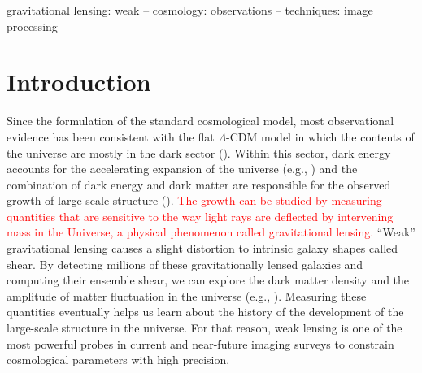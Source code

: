\documentclass[fleqn,usenatbib]{mnras}
\begin{document}
\begin{keywords}
gravitational lensing: weak -- cosmology: observations -- techniques: image processing
\end{keywords}



\section{Introduction}

Since the formulation of the standard cosmological model, most observational evidence has been consistent with the flat $\Lambda$-CDM model in which the contents of the universe are mostly in the dark sector (\citealt{2020A&A...641A...8P, 2020MNRAS.498.2492G, 2020MNRAS.499.5527T, 2021A&A...645A.104A, 2022PhRvD.105b3520A, 2022arXiv220204077B}). Within this sector, dark energy accounts for the accelerating expansion of the universe (e.g., \citealt{1998AJ....116.1009R, 1999AIPC..478..129P}) and the combination of dark energy and dark matter are responsible for the observed growth of large-scale structure (\citealt{2015RPPh...78h6901K, 2017grle.book.....D}). \textcolor{red}{The growth can be studied by measuring quantities that are sensitive to the way light rays are deflected by intervening mass in the Universe, a physical phenomenon called gravitational lensing.} “Weak” gravitational lensing causes a slight distortion to intrinsic galaxy shapes called shear. By detecting millions of these gravitationally lensed galaxies and computing their ensemble shear, we can explore the dark matter density and the amplitude of matter fluctuation in the universe (e.g., \citealt{2001PhR...340..291B}). Measuring these quantities eventually helps us learn about the history of the development of the large-scale structure in the universe. For that reason, weak lensing is one of the most powerful probes in current and near-future imaging surveys to constrain cosmological parameters with high precision. 
\end{document}
